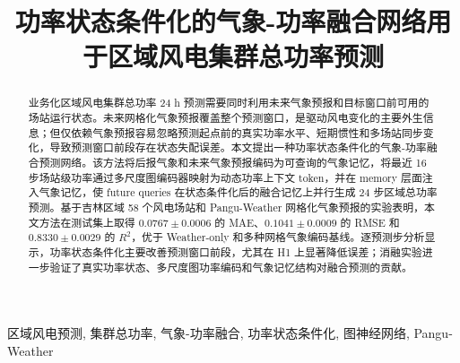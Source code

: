 \documentclass[conference]{IEEEtran}
\begin{document}
\title{功率状态条件化的气象-功率融合网络用于区域风电集群总功率预测}

\author{
\and
{}
\and
{}
\and
{}
\and
{}
}

\maketitle

\begin{abstract}
业务化区域风电集群总功率 24 h 预测需要同时利用未来气象预报和目标窗口前可用的场站运行状态。未来网格化气象预报覆盖整个预测窗口，是驱动风电变化的主要外生信息；但仅依赖气象预报容易忽略预测起点前的真实功率水平、短期惯性和多场站同步变化，导致预测窗口前段存在状态失配误差。本文提出一种功率状态条件化的气象-功率融合预测网络。该方法将后报气象和未来气象预报编码为可查询的气象记忆，将最近 16 步场站级功率通过多尺度图编码器映射为动态功率上下文 token，并在 memory 层面注入气象记忆，使 future queries 在状态条件化后的融合记忆上并行生成 24 步区域总功率预测。基于吉林区域 58 个风电场站和 Pangu-Weather 网格化气象预报的实验表明，本文方法在测试集上取得 \(0.0767\pm0.0006\) 的 MAE、\(0.1041\pm0.0009\) 的 RMSE 和 \(0.8330\pm0.0029\) 的 \(R^2\)，优于 Weather-only 和多种网格气象编码基线。逐预测步分析显示，功率状态条件化主要改善预测窗口前段，尤其在 H1 上显著降低误差；消融实验进一步验证了真实功率状态、多尺度图功率编码和气象记忆结构对融合预测的贡献。
\end{abstract}

\begin{IEEEkeywords}
区域风电预测, 集群总功率, 气象-功率融合, 功率状态条件化, 图神经网络, Pangu-Weather
\end{IEEEkeywords}







\end{document}
